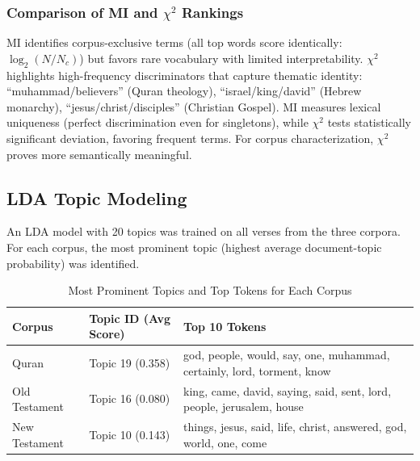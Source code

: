 \documentclass[10pt,a4paper]{article}
\begin{document}
\subsubsection{Comparison of MI and $\chi^2$ Rankings}

MI identifies corpus-exclusive terms (all top words score identically: $\log_2(N/N_c)$) but favors rare vocabulary with limited interpretability. $\chi^2$ highlights high-frequency discriminators that capture thematic identity: ``muhammad/believers'' (Quran theology), ``israel/king/david'' (Hebrew monarchy), ``jesus/christ/disciples'' (Christian Gospel). MI measures lexical uniqueness (perfect discrimination even for singletons), while $\chi^2$ tests statistically significant deviation, favoring frequent terms. For corpus characterization, $\chi^2$ proves more semantically meaningful.

\subsection{LDA Topic Modeling}

An LDA model with 20 topics was trained on all verses from the three corpora. For each corpus, the most prominent topic (highest average document-topic probability) was identified.

\begin{table}[h]
\centering
\caption{Most Prominent Topics and Top Tokens for Each Corpus}
\label{tab:lda_topics}
\small
\begin{tabular}{p{2.5cm}p{1.8cm}p{8.5cm}}
\toprule
\textbf{Corpus} & \textbf{Topic ID (Avg Score)} & \textbf{Top 10 Tokens} \\
\midrule
Quran & Topic 19 (0.358) & god, people, would, say, one, muhammad, certainly, lord, torment, know \\
\midrule
Old Testament & Topic 16 (0.080) & king, came, david, saying, said, sent, lord, people, jerusalem, house \\
\midrule
New Testament & Topic 10 (0.143) & things, jesus, said, life, christ, answered, god, world, one, come \\
\bottomrule
\end{tabular}
\end{table}
\end{document}
